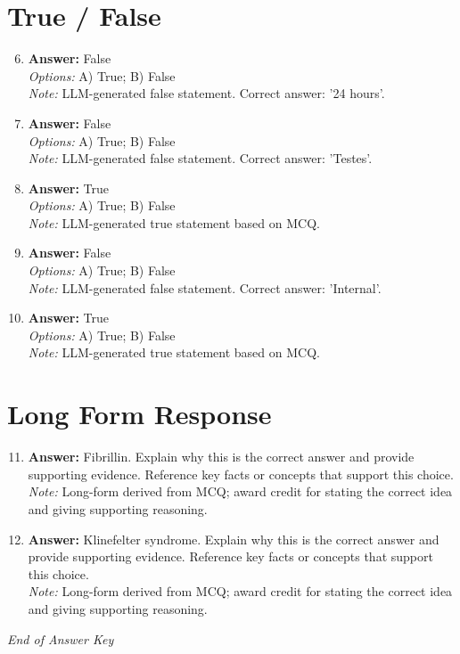 \documentclass[12pt]{article}
\begin{document}
\section*{True / False}
\begin{enumerate}[label=\arabic*.]
\setcounter{enumi}{5}
\item \textbf{Answer:} False
\\ \textit{Options:} A) True; B) False
\\ \textit{Note:} LLM-generated false statement. Correct answer: '24 hours'.
\item \textbf{Answer:} False
\\ \textit{Options:} A) True; B) False
\\ \textit{Note:} LLM-generated false statement. Correct answer: 'Testes'.
\item \textbf{Answer:} True
\\ \textit{Options:} A) True; B) False
\\ \textit{Note:} LLM-generated true statement based on MCQ.
\item \textbf{Answer:} False
\\ \textit{Options:} A) True; B) False
\\ \textit{Note:} LLM-generated false statement. Correct answer: 'Internal'.
\item \textbf{Answer:} True
\\ \textit{Options:} A) True; B) False
\\ \textit{Note:} LLM-generated true statement based on MCQ.
\end{enumerate}

\section*{Long Form Response}
\begin{enumerate}[label=\arabic*.]
\setcounter{enumi}{10}
\item \textbf{Answer:} Fibrillin. Explain why this is the correct answer and provide supporting evidence. Reference key facts or concepts that support this choice.
\\ \textit{Note:} Long-form derived from MCQ; award credit for stating the correct idea and giving supporting reasoning.
\item \textbf{Answer:} Klinefelter syndrome. Explain why this is the correct answer and provide supporting evidence. Reference key facts or concepts that support this choice.
\\ \textit{Note:} Long-form derived from MCQ; award credit for stating the correct idea and giving supporting reasoning.
\end{enumerate}

\vfill
\noindent\textit{End of Answer Key}
\end{document}
